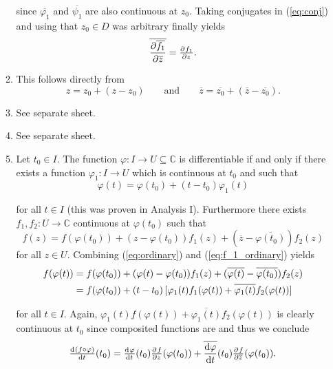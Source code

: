 \begin{enumerate}[label = \textbf{Exercise \arabic*.},wide = 0pt, itemsep=1.5ex]
\begin{enumerate}[label = (\roman*),wide = 0pt, itemsep=1.5ex]
				\noindent since $\overline{\varphi_1}$ and $\overline{\psi_1}$ are also continuous at $z_0$. Taking conjugates in (\ref{eq:conj}) and using that $z_0 \in D$ was arbitrary finally yields
				\begin{equation}
					\overline{\frac{\partial\overline{f_1}}{\partial\overline{z}}} = \pd{f_1}{z}.
				\end{equation}

			\item This follows directly from
				\begin{equation}
					z = z_0 + (z - z_0) \qquad \text{and} \qquad \overline{z} = \overline{z_0} + (\overline{z} - \overline{z_0}).
				\end{equation}

			\item See separate sheet.
			\item See separate sheet.
			\item Let $t_0 \in I$. The function $\varphi: I \to U \subseteq \mathbb{C}$ is differentiable if and only if there exists a function $\varphi_1: I \to U$ which is continuous at $t_0$ and such that
				\begin{equation}
					\varphi(t) = \varphi(t_0) + (t - t_0)\varphi_1(t)
					\label{eq:ordinary}
				\end{equation}

				\noindent for all $t \in I$ (this was proven in Analysis I). Furthermore there exists $f_1,f_2: U \to \mathbb{C}$ continuous at $\varphi(t_0)$ such that 
				\begin{equation}
					f(z) = f(\varphi(t_0)) + (z - \varphi(t_0))f_1(z) + (\overline{z} - \overline{\varphi(t_0)})f_2(z)
					\label{eq:f_1_ordinary}
				\end{equation}
				\noindent for all $z \in U$. Combining (\ref{eq:ordinary}) and (\ref{eq:f_1_ordinary}) yields
				\begin{align*}
					f(\varphi(t)) &= f(\varphi(t_0)) + (\varphi(t) - \varphi(t_0))f_1(z) + (\overline{\varphi(t)} - \overline{\varphi(t_0)})f_2(z)\\
					&= f(\varphi(t_0)) + (t - t_0)\sbr[0]{\varphi_1(t)f_1(\varphi(t)) + \overline{\varphi_1(t)}f_2(\varphi(t))}
				\end{align*}

				\noindent for all $t \in I$. Again, $\varphi_1(t)f(\varphi(t)) + \overline{\varphi_1(t)}f_2(\varphi(t))$ is clearly continuous at $t_0$ since composited functions are and thus we conclude
				\begin{equation}
					\od{(f \circ \varphi)}{t}(t_0) = \od{\varphi}{t}(t_0)\pd{f}{z}(\varphi(t_0)) + \overline{\frac{\d \varphi}{\d t}}(t_0)\pd{f}{\overline{z}}(\varphi(t_0)).
				\end{equation}


\end{enumerate}
\end{enumerate}

